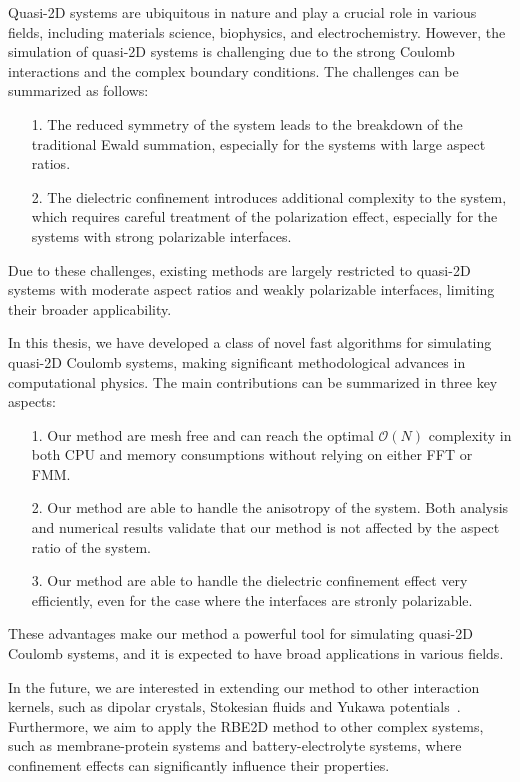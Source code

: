 Quasi-2D systems are ubiquitous in nature and play a crucial role in various fields, including materials science, biophysics, and electrochemistry. 
However, the simulation of quasi-2D systems is challenging due to the strong Coulomb interactions and the complex boundary conditions.
The challenges can be summarized as follows:
\begin{itemize}
    \item[1.] The reduced symmetry of the system leads to the breakdown of the traditional Ewald summation, especially for the systems with large aspect ratios.
    \item[2.] The dielectric confinement introduces additional complexity to the system, which requires careful treatment of the polarization effect, especially for the systems with strong polarizable interfaces.
\end{itemize}
Due to these challenges, existing methods are largely restricted to quasi-2D systems with moderate aspect ratios and weakly polarizable interfaces, limiting their broader applicability.

In this thesis, we have developed a class of novel fast algorithms for simulating quasi-2D Coulomb systems, making significant methodological advances in computational physics. 
The main contributions can be summarized in three key aspects:
\begin{itemize}
    \item[1.] Our method are mesh free and can reach the optimal $\mathcal{O}(N)$ complexity in both CPU and memory consumptions without relying on either FFT or FMM.
    \item[2.] Our method are able to handle the anisotropy of the system. Both analysis and numerical results validate that our method is not affected by the aspect ratio of the system.
    \item[3.] Our method are able to handle the dielectric confinement effect very efficiently, even for the case where the interfaces are stronly polarizable.
\end{itemize}
These advantages make our method a powerful tool for simulating quasi-2D Coulomb systems, and it is expected to have broad applications in various fields.

In the future, we are interested in extending our method to other interaction kernels, such as dipolar crystals, Stokesian fluids and Yukawa potentials~\cite{Messina2017PRL,Hou2009PRL}.
Furthermore, we aim to apply the RBE2D method to other complex systems, such as membrane-protein systems and battery-electrolyte systems, where confinement effects can significantly influence their properties.